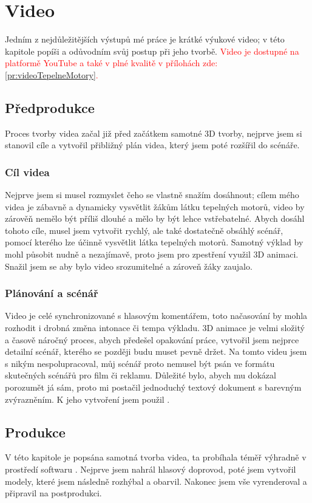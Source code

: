 \section{Video}
{Jedním z nejdůležitějších výstupů mé práce je krátké výukové video; v této kapitole popíši a odůvodním svůj postup při jeho tvorbě. \textcolor{red}{Video je dostupné na platformě YouTube a také v plné kvalitě v přílohách zde: \ref{pr:videoTepelneMotory}.}}

\subsection{Předprodukce}
{Proces tvorby videa začal již před začátkem samotné 3D tvorby, nejprve jsem si stanovil cíle a vytvořil přibližný plán videa, který jsem poté rozšířil do scénáře.}\odst

\subsubsection{Cíl videa}
{Nejprve jsem si musel rozmyslet čeho se vlastně snažím dosáhnout; cílem mého videa je zábavně a dynamicky vysvětlit žákům látku tepelných motorů, video by zárověň nemělo být příliš dlouhé a mělo by být lehce vstřebatelné.}\odst
{Abych dosáhl tohoto cíle, musel jsem vytvořit rychlý, ale také dostatečně obsáhlý scénář, pomocí kterého lze účinně vysvětlit látka tepelných motorů. Samotný výklad by mohl působit nudně a nezajímavě, proto jsem pro zpestření využil 3D animaci. Snažil jsem se aby bylo video srozumitelné a zároveň žáky zaujalo.}

\subsubsection{Plánování a scénář}
{Video je celé synchronizované s hlasovým komentářem, toto načasování by mohla rozhodit i drobná změna intonace či tempa výkladu. 3D animace je velmi složitý a časově náročný proces, abych předešel opakování práce, vytvořil jsem nejprce detailní scénář, kterého se později budu muset pevně držet.}\odst
{Na tomto videu jsem s nikým nespolupracoval, můj scénář proto nemusel být psán ve formátu skutečných scénářů pro film či reklamu. Důležité bylo, abych mu dokázal porozumět já sám, proto mi postačil jednoduchý textový dokument s barevným zvýrazněním. K jeho vytvoření jsem použil .}

\newpage

\subsection{Produkce}
{V této kapitole je popsána samotná tvorba videa, ta probíhala téměř výhradně v prostředí softwaru . Nejprve jsem nahrál hlasový doprovod, poté jsem vytvořil modely, které jsem následně rozhýbal a obarvil. Nakonec jsem vše vyrenderoval a připravil na postprodukci.}

